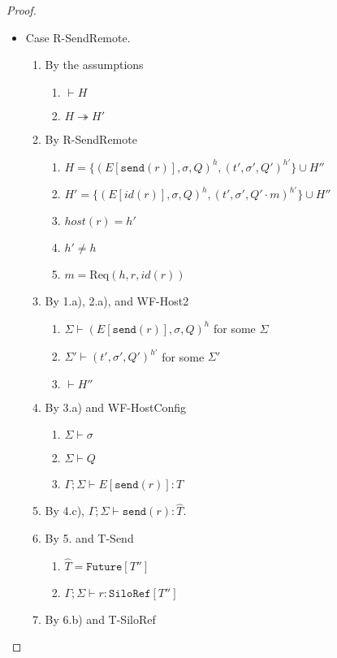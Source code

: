 \documentclass{article}
\theoremstyle{definition}
\newcommand{\Req}[3]{\text{Req}(#1, #2, #3)}
\begin{document}
\begin{proof}
\begin{itemize}
\item Case R-SendRemote.
\begin{enumerate}
\item By the assumptions
  \begin{enumerate}[label=(\alph*)]
  \item $\vdash H$
  \item $H \twoheadrightarrow H'$
  \end{enumerate}
\item By R-SendRemote
  \begin{enumerate}[label=(\alph*)]
  \item $H = \{ (E[\texttt{send}(r)], \sigma, Q)^h, (t', \sigma', Q')^{h'} \} \cup H''$
  \item $H' = \{ (E[id(r)], \sigma, Q)^h, (t', \sigma', Q' \cdot m)^{h'} \} \cup H''$
  \item $host(r) = h'$
  \item $h' \neq h$
  \item $m = {\Req h r {id(r)}}$  %
  \end{enumerate}
\item By 1.a), 2.a), and WF-Host2
  \begin{enumerate}[label=(\alph*)]
  \item $\Sigma \vdash (E[\texttt{send}(r)], \sigma, Q)^h$ for some $\Sigma$
  \item $\Sigma' \vdash (t', \sigma', Q')^{h'}$ for some $\Sigma'$
  \item $\vdash H''$
  \end{enumerate}
\item By 3.a) and WF-HostConfig
  \begin{enumerate}[label=(\alph*)]
  \item $\Sigma \vdash \sigma$
  \item $\Sigma \vdash Q$
  \item $\Gamma ; \Sigma \vdash E[\texttt{send}(r)] : T$
  \end{enumerate}
\item By 4.c), $\Gamma ; \Sigma \vdash \texttt{send}(r) : \hat{T}$.
\item By 5. and T-Send
  \begin{enumerate}[label=(\alph*)]
  \item $\hat{T} = \texttt{Future}[T'']$
  \item $\Gamma ; \Sigma \vdash r : \texttt{SiloRef}[T'']$
  \end{enumerate}
\item By 6.b) and T-SiloRef

\end{enumerate}
\end{itemize}
\end{proof}
\end{document}
